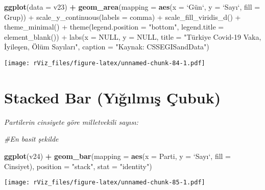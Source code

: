 \documentclass[
]{book}
\newenvironment{Shaded}{\begin{snugshade}}{\end{snugshade}}
\newcommand{\CommentTok}[1]{\textcolor[rgb]{0.56,0.35,0.01}{\textit{#1}}}
\newcommand{\DataTypeTok}[1]{\textcolor[rgb]{0.13,0.29,0.53}{#1}}
\newcommand{\KeywordTok}[1]{\textcolor[rgb]{0.13,0.29,0.53}{\textbf{#1}}}
\newcommand{\NormalTok}[1]{#1}
\newcommand{\OperatorTok}[1]{\textcolor[rgb]{0.81,0.36,0.00}{\textbf{#1}}}
\newcommand{\StringTok}[1]{\textcolor[rgb]{0.31,0.60,0.02}{#1}}
\begin{document}
\begin{Shaded}
\begin{Highlighting}[]
\KeywordTok{ggplot}\NormalTok{(}\DataTypeTok{data =}\NormalTok{ v23) }\OperatorTok{+}
\StringTok{  }\KeywordTok{geom_area}\NormalTok{(}\DataTypeTok{mapping =} \KeywordTok{aes}\NormalTok{(}\DataTypeTok{x =} \StringTok{`}\DataTypeTok{Gün`, y = }\StringTok{`}\NormalTok{Sayı}\StringTok{`}\DataTypeTok{, fill = Grup)) +}
\DataTypeTok{  scale_y_continuous(labels = comma) +}
\DataTypeTok{  scale_fill_viridis_d() +}
\DataTypeTok{  theme_minimal() +}
\DataTypeTok{  theme(legend.position = "bottom",}
\DataTypeTok{        legend.title = element_blank()) +}
\DataTypeTok{  labs(x = NULL,}
\DataTypeTok{       y = NULL,}
\DataTypeTok{       title = "Türkiye Covid-19 Vaka, İyileşen, Ölüm Sayıları",}
\DataTypeTok{       caption = "Kaynak: CSSEGISandData")}
\end{Highlighting}
\end{Shaded}

\texttt{[image: rViz\_files/figure-latex/unnamed-chunk-84-1.pdf]}

\hypertarget{stacked-bar-yux131ux11fux131lmux131ux15f-uxe7ubuk}{%
\section{Stacked Bar (Yığılmış Çubuk)}\label{stacked-bar-yux131ux11fux131lmux131ux15f-uxe7ubuk}}

\emph{Partilerin cinsiyete göre milletvekili sayısı:}

\begin{Shaded}
\begin{Highlighting}[]
\CommentTok{#En basit şekilde}

\KeywordTok{ggplot}\NormalTok{(v24) }\OperatorTok{+}\StringTok{ }
\StringTok{    }\KeywordTok{geom_bar}\NormalTok{(}\DataTypeTok{mapping =} \KeywordTok{aes}\NormalTok{(}\DataTypeTok{x =}\NormalTok{ Parti, }\DataTypeTok{y =} \StringTok{`}\DataTypeTok{Sayı}\StringTok{`}\NormalTok{, }\DataTypeTok{fill =}\NormalTok{ Cinsiyet), }\DataTypeTok{position =} \StringTok{"stack"}\NormalTok{, }\DataTypeTok{stat =} \StringTok{"identity"}\NormalTok{)}
\end{Highlighting}
\end{Shaded}

\texttt{[image: rViz\_files/figure-latex/unnamed-chunk-85-1.pdf]}
\end{document}

